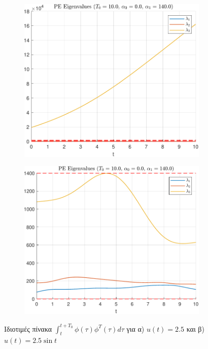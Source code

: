 \documentclass[a4paper,12pt]{article}
\begin{document}
\begin{figure}[h!]
    \centering
    \begin{subfigure}{0.45\textwidth}
        \centering
        \includegraphics[width=\linewidth]{plot/PE_eigenvalues_1.pdf}
        \caption{}
        \label{fig:PE_eigenvalues_1}
    \end{subfigure}
    \hfill
    \begin{subfigure}{0.45\textwidth}
        \centering
        \includegraphics[width=\linewidth]{plot/PE_eigenvalues_2.pdf}
        \caption{}
        \label{fig:PE_eigenvalues_2}
    \end{subfigure}
    \caption{Ιδιοτιμές πίνακα $\int_{t}^{t+T_0} \phi(\tau) \phi^T(\tau) d\tau$ για 
    α) $u(t) = 2.5$ και β) $u(t) = 2.5 \sin t$}
    \label{fig:PE_eigenvalues}
\end{figure}
\end{document}

